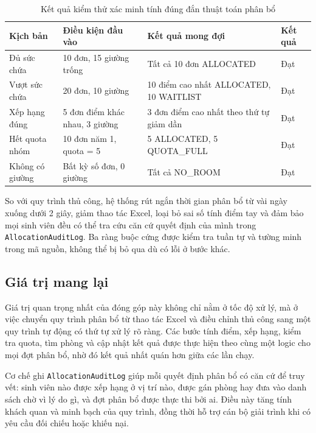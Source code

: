 \documentclass[../DoAn.tex]{subfiles}
\begin{document}
\begin{table}[H]
\centering
\caption{Kết quả kiểm thử xác minh tính đúng đắn thuật toán phân bổ}
\label{tab:alloc_verification}
\small
\begin{tabular}{|p{3.0cm}|p{3.6cm}|p{3.8cm}|p{1.8cm}|}
\hline
\textbf{Kịch bản} & \textbf{Điều kiện đầu vào} & \textbf{Kết quả mong đợi} & \textbf{Kết quả} \\
\hline
Đủ sức chứa & 10 đơn, 15 giường trống & Tất cả 10 đơn ALLOCATED & Đạt \\
\hline
Vượt sức chứa & 20 đơn, 10 giường & 10 điểm cao nhất ALLOCATED, 10 WAITLIST & Đạt \\
\hline
Xếp hạng đúng & 5 đơn điểm khác nhau, 3 giường & 3 đơn điểm cao nhất theo thứ tự giảm dần & Đạt \\
\hline
Hết quota nhóm & 10 đơn năm 1, quota = 5 & 5 ALLOCATED, 5 QUOTA\_FULL & Đạt \\
\hline
Không có giường & Bất kỳ số đơn, 0 giường & Tất cả NO\_ROOM & Đạt \\
\hline
\end{tabular}
\end{table}

So với quy trình thủ công, hệ thống rút ngắn thời gian phân bổ từ vài ngày
xuống dưới 2 giây, giảm thao tác Excel, loại bỏ sai số tính điểm tay và đảm
bảo mọi sinh viên đều có thể tra cứu căn cứ quyết định của mình trong
\texttt{AllocationAuditLog}. Ba ràng buộc cứng được kiểm tra tuần tự và tường
minh trong mã nguồn, không thể bị bỏ qua dù có lỗi ở bước khác.

\subsection{Giá trị mang lại}
\label{subsec:alloc_value}

Giá trị quan trọng nhất của đóng góp này không chỉ nằm ở tốc độ xử lý, mà ở
việc chuyển quy trình phân bổ từ thao tác Excel và điều chỉnh thủ công sang
một quy trình tự động có thứ tự xử lý rõ ràng. Các bước tính điểm, xếp hạng,
kiểm tra quota, tìm phòng và cập nhật kết quả được thực hiện theo cùng một
logic cho mọi đợt phân bổ, nhờ đó kết quả nhất quán hơn giữa các lần chạy.

Cơ chế ghi \texttt{AllocationAuditLog} giúp mỗi quyết định phân bổ có căn cứ
để truy vết: sinh viên nào được xếp hạng ở vị trí nào, được gán phòng hay đưa
vào danh sách chờ vì lý do gì, và đợt phân bổ được thực thi bởi ai. Điều này
tăng tính khách quan và minh bạch của quy trình, đồng thời hỗ trợ cán bộ giải
trình khi có yêu cầu đối chiếu hoặc khiếu nại.
\end{document}

